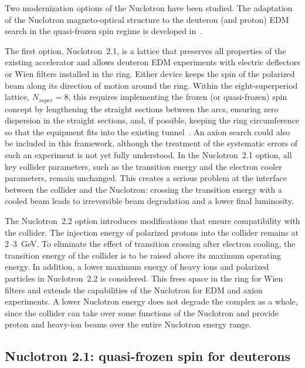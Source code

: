 \documentclass[%
  aps,
  pra,
  preprint,
  a4paper,
  amsmath,
  amssymb,
  floatfix,
  longbibliography,
  superscriptaddress
]{revtex4-2}
\begin{document}
Two modernization options of the Nuclotron have been studied. The adaptation of
the Nuclotron magneto-optical structure to the deuteron (and proton) EDM search
in the quasi-frozen spin regime is developed
in~\cite{Senichev:2023vtx,Senichev:2024vhw,Senichev:2025ude,Senichev:2026xca}.

The first option, Nuclotron~2.1, is a lattice that preserves all properties of
the existing accelerator and allows deuteron EDM experiments with electric
deflectors or Wien filters installed in the ring. Either device keeps the spin
of the polarized beam along its direction of motion around the ring. Within the
eight-superperiod lattice, $N_{super} = 8$, this requires implementing the
frozen (or quasi-frozen) spin concept by lengthening the straight sections
between the arcs, ensuring zero dispersion in the straight sections, and, if
possible, keeping the ring circumference so that the equipment fits into the
existing tunnel~\cite{Senichev:2023vtx,Senichev:2024vhw}. An axion search could also be included in this framework,
although the treatment of the systematic errors of such an experiment is not
yet fully understood. In the Nuclotron~2.1 option, all key collider
parameters, such as the transition energy and the electron cooler parameters,
remain unchanged. This creates a serious problem at the interface between the
collider and the Nuclotron: crossing the transition energy with a cooled beam
leads to irreversible beam degradation and a lower final luminosity.

The Nuclotron~2.2 option introduces modifications that ensure compatibility
with the collider. The injection energy of polarized protons into the collider
remains at 2--\SI{3}{GeV}. To eliminate the effect of transition crossing after
electron cooling, the transition energy of the collider is to be raised above
its maximum operating energy. In addition, a lower maximum energy of heavy ions
and polarized particles in Nuclotron~2.2 is considered. This frees space in the
ring for Wien filters and extends the capabilities of the Nuclotron for EDM and
axion experiments. A lower Nuclotron energy does not degrade the complex as a
whole, since the collider can take over some functions of the Nuclotron and
provide proton and heavy-ion beams over the entire Nuclotron energy range.

\subsection{Nuclotron 2.1: quasi-frozen spin for deuterons}
\end{document}
